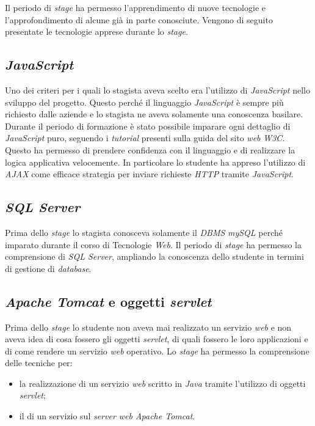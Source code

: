 Il periodo di \textit{stage} ha permesso l'apprendimento di nuove tecnologie e l'approfondimento di alcune già in parte conosciute. Vengono di seguito presentate le tecnologie apprese durante lo \textit{stage}.

\subsection{\textit{JavaScript}}

Uno dei criteri per i quali lo stagista aveva scelto \visione{} era l'utilizzo di \textit{JavaScript} nello sviluppo del progetto. Questo perché il linguaggio \textit{JavaScript} è sempre più richiesto dalle aziende e lo stagista ne aveva solamente una conoscenza basilare. Durante il periodo di formazione è stato possibile imparare ogni dettaglio di \textit{JavaScript} puro, seguendo i \textit{tutorial} presenti sulla guida del sito \textit{web} \textit{W3C}. Questo ha permesso di prendere confidenza con il linguaggio e di realizzare la logica applicativa velocemente. In particolare lo studente ha appreso l'utilizzo di \textit{AJAX} come efficace strategia per inviare richieste \textit{HTTP} tramite \textit{JavaScript}.

\subsection{\textit{SQL Server}}

Prima dello \textit{stage} lo stagista conosceva solamente il \textit{DBMS} \textit{mySQL} perché imparato durante il corso di Tecnologie \textit{Web}. Il periodo di \textit{stage} ha permesso la comprensione di \textit{SQL Server}, ampliando la conoscenza dello studente in termini di gestione di \textit{database}.

\subsection{\textit{Apache Tomcat} e oggetti \textit{servlet}}

Prima dello \textit{stage} lo studente non aveva mai realizzato un servizio \textit{web} e non aveva idea di cosa fossero gli oggetti \textit{servlet}, di quali fossero le loro applicazioni e di come rendere un servizio \textit{web} operativo. Lo \textit{stage} ha permesso la comprensione delle tecniche per:
\begin{itemize}
	\item la realizzazione di un servizio \textit{web} scritto in \textit{Java} tramite l'utilizzo di oggetti \textit{servlet};
	\item il  di un servizio sul \textit{server web} \textit{Apache Tomcat}.
\end{itemize}

